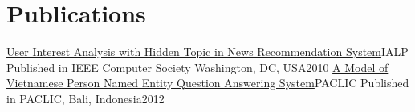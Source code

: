 \section{Publications}
  \resumeSubHeadingListStart
    \resumeSubheading
      {\href{https://ieeexplore.ieee.org/document/5681626}{User Interest Analysis with Hidden Topic in News Recommendation System}}{IALP}
      {Published in IEEE Computer Society Washington, DC, USA}{2010}
    \resumeSubheading
      {\href{https://aclanthology.org/Y12-1035.pdf}{A Model of Vietnamese Person Named Entity Question Answering System}}{PACLIC}
      {Published in PACLIC, Bali, Indonesia}{2012} 
  \resumeSubHeadingListEnd